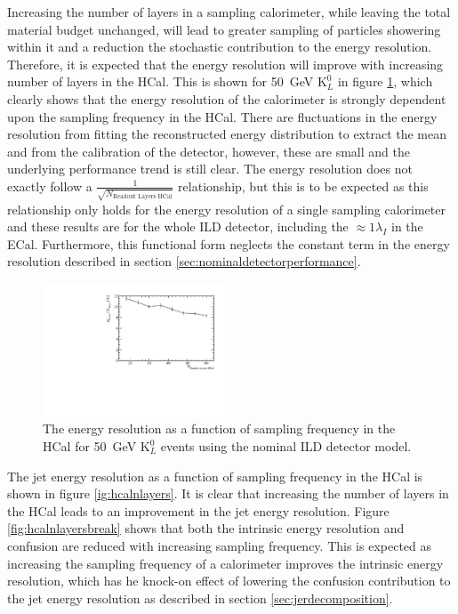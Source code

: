 Increasing the number of layers in a sampling calorimeter, while leaving the total material budget unchanged, will lead to greater sampling of particles showering within it and a reduction the stochastic contribution to the energy resolution.  Therefore, it is expected that the energy resolution will improve with increasing number of layers in the HCal.  This is shown for 50~GeV $\text{K}^{0}_{L}$ in figure \ref{fig:hcalnlayerser}, which clearly shows that the energy resolution of the calorimeter is strongly dependent upon the sampling frequency in the HCal.  There are fluctuations in the energy resolution from fitting the reconstructed energy distribution to extract the mean and from the calibration of the detector, however, these are small and the underlying performance trend is still clear.  The energy resolution does not exactly follow a $\frac{1}{\sqrt{N_{\text{Readout Layers HCal}}}}$ relationship, but this is to be expected as this relationship only holds for the energy resolution of a single sampling calorimeter and these results are for the whole ILD detector, including the $\approx 1 \lambda_{I}$ in the ECal.  Furthermore, this functional form neglects the constant term in the energy resolution described in section \ref{sec:nominaldetectorperformance}.  

\begin{figure}[h!]
\centering
\includegraphics[width=0.5\textwidth]{OptimisationStudies/Plots/EnergyResolution/ER_vs_NHCalVariableLayers_50GeVKaon0L.pdf}
\caption[The energy resolution as a function of sampling frequency in the HCal for 50~GeV $\text{K}^{0}_{L}$ events using the nominal ILD detector model.]{The energy resolution as a function of sampling frequency in the HCal for 50~GeV $\text{K}^{0}_{L}$ events using the nominal ILD detector model.}
\label{fig:hcalnlayerser}
\end{figure}  

The jet energy resolution as a function of sampling frequency in the HCal is shown in figure \ref{ig:hcalnlayers}.  It is clear that increasing the number of layers in the HCal leads to an improvement in the jet energy resolution.  Figure \ref{fig:hcalnlayersbreak} shows that both the intrinsic energy resolution and confusion are reduced with increasing sampling frequency.  This is expected as increasing the sampling frequency of a calorimeter improves the intrinsic energy resolution, which has he knock-on effect of lowering the confusion contribution to the jet energy resolution as described in section \ref{sec:jerdecomposition}.   

